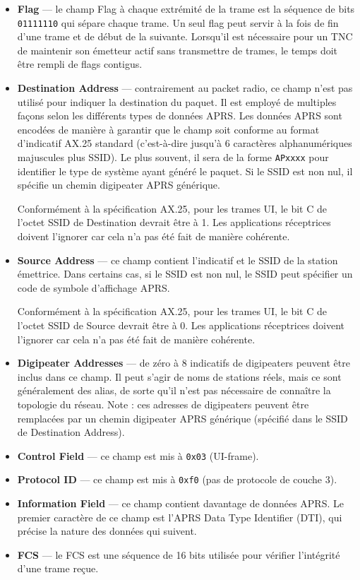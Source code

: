 \begin{aprssideblock}{}
\begin{itemize}
\tightlist
\item
  \textbf{Flag} --- le champ Flag à chaque extrémité de la trame est la
  séquence de bits \texttt{01111110} qui sépare chaque trame. Un seul
  flag peut servir à la fois de fin d'une trame et de début de la
  suivante. Lorsqu'il est nécessaire pour un TNC de maintenir son
  émetteur actif sans transmettre de trames, le temps doit être rempli
  de flags contigus.
\item
  \textbf{Destination Address} --- contrairement au packet radio, ce
  champ n'est pas utilisé pour indiquer la destination du paquet. Il est
  employé de multiples façons selon les différents types de données APRS.
  Les données APRS sont encodées de manière à garantir que le champ soit
  conforme au format d'indicatif AX.25 standard (c'est-à-dire jusqu'à 6
  caractères alphanumériques majuscules plus SSID). Le plus souvent, il
  sera de la forme \texttt{APxxxx} pour identifier le type de système
  ayant généré le paquet. Si le SSID est non nul, il spécifie un chemin
  digipeater APRS générique.

  Conformément à la spécification AX.25, pour les trames UI, le bit C
  de l'octet SSID de Destination devrait être à 1. Les applications
  réceptrices doivent l'ignorer car cela n'a pas été fait de manière
  cohérente.
\item
  \textbf{Source Address} --- ce champ contient l'indicatif et le SSID
  de la station émettrice. Dans certains cas, si le SSID est non nul, le
  SSID peut spécifier un code de symbole d'affichage APRS.

  Conformément à la spécification AX.25, pour les trames UI, le bit C
  de l'octet SSID de Source devrait être à 0. Les applications
  réceptrices doivent l'ignorer car cela n'a pas été fait de manière
  cohérente.
\item
  \textbf{Digipeater Addresses} --- de zéro à 8 indicatifs de
  digipeaters peuvent être inclus dans ce champ. Il peut s'agir de noms
  de stations réels, mais ce sont généralement des alias, de sorte qu'il
  n'est pas nécessaire de connaître la topologie du réseau. Note : ces
  adresses de digipeaters peuvent être remplacées par un chemin
  digipeater APRS générique (spécifié dans le SSID de Destination
  Address).
\item
  \textbf{Control Field} --- ce champ est mis à \texttt{0x03} (UI-frame).
\item
  \textbf{Protocol ID} --- ce champ est mis à \texttt{0xf0} (pas de
  protocole de couche 3).
\item
  \textbf{Information Field} --- ce champ contient davantage de données
  APRS. Le premier caractère de ce champ est l'APRS Data Type
  Identifier (DTI), qui précise la nature des données qui suivent.
\item
  \textbf{FCS} --- le FCS est une séquence de 16 bits utilisée pour
  vérifier l'intégrité d'une trame reçue.
\end{itemize}
\end{aprssideblock}

